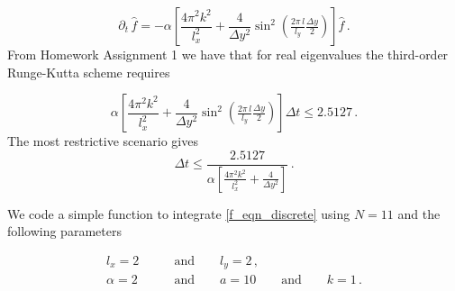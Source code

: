 \documentclass[11pt]{article}
\newcommand{\com}{\, ,}
\newcommand{\per}{\, .}
\def\beq{\begin{equation}}
\def\eeq{\end{equation}}
\begin{document}
\begin{enumerate}[label=(\alph*)]
        \beq
        \partial_t\,\hat f = - \alpha\left[\frac{4\pi^2k^2}{l_x^2} + \frac{4}{\Delta y^2}\sin^2\left(\tfrac{2\pi\,l}{l_y}\tfrac{\Delta y}{2}\right)\right] \hat f \per
        \eeq
        From Homework Assignment 1 we have that for real eigenvalues the third-order Runge-Kutta scheme requires

        \beq
             \alpha\left[\frac{4\pi^2k^2}{l_x^2} + \frac{4}{\Delta y^2}\sin^2\left(\tfrac{2\pi\,l}{l_y}\tfrac{\Delta y}{2}\right)\right] \Delta t \leq 2.5127\per
        \eeq
        The most restrictive scenario gives 
        \beq
        \Delta t \leq \frac{2.5127}{\alpha\left[\frac{4\pi^2k^2}{l_x^2} + \frac{4}{\Delta y^2}\right] }\per
        \eeq

        We code a simple function to integrate \eqref{f_eqn_discrete} using $N=11$ and the following parameters

        \begin{align}
            l_x = 2& \qquad\text{and}\qquad l_y=2\com \nonumber\\
            \alpha = 2 & \qquad\text{and}\qquad a=10 \qquad \text{and}\qquad k=1\per \\
        \end{align}


\end{enumerate}

\end{document}
